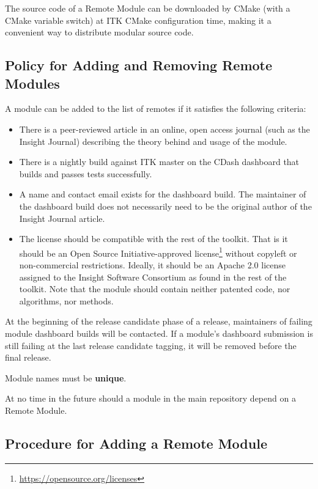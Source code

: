 The source code of a Remote Module can be downloaded by CMake (with a CMake
variable switch) at ITK CMake configuration time, making it a convenient way to
distribute modular source code.

\subsection{Policy for Adding and Removing Remote Modules}
\label{subsec:RemoteModuleAddRemovePolicy}

A module can be added to the list of remotes if it satisfies the following
criteria:
\begin{itemize}
\item There is a peer-reviewed article in an online, open access journal (such
as the Insight Journal) describing the theory behind and usage of the module.
\item There is a nightly build against ITK master on the CDash dashboard that
builds and passes tests successfully.
\item A name and contact email exists for the dashboard build. The maintainer
of the dashboard build does not necessarily need to be the original author of
the Insight Journal article.
\item The license should be compatible with the rest of the toolkit. That is
it should be an Open Source Initiative-approved
license\footnote{\url{https://opensource.org/licenses}} without copyleft or
non-commercial restrictions. Ideally, it should be an Apache 2.0 license
assigned to the Insight Software Consortium as found in the rest of the
toolkit. Note that the module should contain neither patented code, nor
algorithms, nor methods.
\end{itemize}

At the beginning of the release candidate phase of a release, maintainers of
failing module dashboard builds will be contacted. If a module's dashboard
submission is still failing at the last release candidate tagging, it will be
removed before the final release.

Module names must be \textbf{unique}.

At no time in the future should a module in the main repository depend on a
Remote Module.

\subsection{Procedure for Adding a Remote Module}
\label{subsec:ProcedureAddingRemoteModules}

